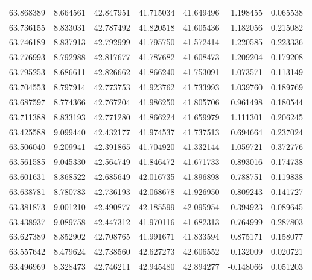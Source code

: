 \begin{tabular}{rrrrrrr}
 63.868389 &   8.664561 &         42.847951 &         41.715034 &         41.649496 &  1.198455 &  0.065538 \\
 63.736155 &   8.833031 &         42.787492 &         41.820518 &         41.605436 &  1.182056 &  0.215082 \\
 63.746189 &   8.837913 &         42.792999 &         41.795750 &         41.572414 &  1.220585 &  0.223336 \\
 63.776993 &   8.792988 &         42.817677 &         41.787682 &         41.608473 &  1.209204 &  0.179208 \\
 63.795253 &   8.686611 &         42.826662 &         41.866240 &         41.753091 &  1.073571 &  0.113149 \\
 63.704553 &   8.797914 &         42.773753 &         41.923762 &         41.733993 &  1.039760 &  0.189769 \\
 63.687597 &   8.774366 &         42.767204 &         41.986250 &         41.805706 &  0.961498 &  0.180544 \\
 63.711388 &   8.833193 &         42.771280 &         41.866224 &         41.659979 &  1.111301 &  0.206245 \\
 63.425588 &   9.099440 &         42.432177 &         41.974537 &         41.737513 &  0.694664 &  0.237024 \\
 63.506040 &   9.209941 &         42.391865 &         41.704920 &         41.332144 &  1.059721 &  0.372776 \\
 63.561585 &   9.045330 &         42.564749 &         41.846472 &         41.671733 &  0.893016 &  0.174738 \\
 63.601631 &   8.868522 &         42.685649 &         42.016735 &         41.896898 &  0.788751 &  0.119838 \\
 63.638781 &   8.780783 &         42.736193 &         42.068678 &         41.926950 &  0.809243 &  0.141727 \\
 63.381873 &   9.001210 &         42.490877 &         42.185599 &         42.095954 &  0.394923 &  0.089645 \\
 63.438937 &   9.089758 &         42.447312 &         41.970116 &         41.682313 &  0.764999 &  0.287803 \\
 63.627389 &   8.852902 &         42.708765 &         41.991671 &         41.833594 &  0.875171 &  0.158077 \\
 63.557642 &   8.479624 &         42.738560 &         42.627273 &         42.606552 &  0.132009 &  0.020721 \\
 63.496969 &   8.328473 &         42.746211 &         42.945480 &         42.894277 & -0.148066 &  0.051203 \\

\end{tabular}
